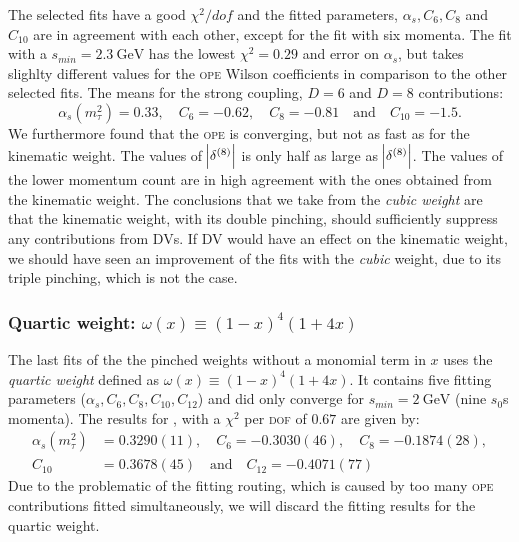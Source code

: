 \documentclass[../../index.tex]{subfiles}
\begin{document}
The selected fits have a good \(\chi^2/dof\) and the fitted parameters,
\(\alpha_s, C_6, C_8\) and \(C_{10}\) are in agreement with each other, except
for the fit with six momenta. The fit with a \(s_{min}=\SI{2.3}{\giga\eV}\) has
the lowest \(\chi^2=0.29\) and error on \(\alpha_s\), but takes slighlty
different values for the \textsc{ope} Wilson coefficients in comparison to the
other selected fits. The means for the strong coupling, \(D=6\) and \(D=8\)
contributions:
\begin{equation}
  \label{eq:wKinResult}
  \alpha_s(m_\tau^2)=0.33, \quad C_6=-0.62, \quad C_8=-0.81 \quad \text{and} \quad C_{10}=-1.5.
\end{equation}
We furthermore found that the \textsc{ope} is converging, but not as fast as for
the kinematic weight. The values of \(\abs{\delta^{(8)}}\) is only half as large
as \(\abs{\delta^{(8)}}\). The values of the lower momentum count are in high
agreement with the ones obtained from the kinematic weight. The conclusions that
we take from the \textit{cubic weight} are that the kinematic weight, with its
double pinching, should sufficiently suppress any contributions from
\textsc{DV}s. If \textsc{DV} would have an effect on the kinematic weight, we
should have seen an improvement of the fits with the \textit{cubic} weight, due
to its triple pinching, which is not the case.

\subsubsection{Quartic weight: \(\omega(x) \equiv (1-x)^4(1+4x)\)}
\label{sec:quarticWeight}
The last fits of the the pinched weights without a monomial term in \(x\) uses
the \textit{quartic weight} defined as \(\omega(x) \equiv (1-x)^4(1+4x)\). It
contains five fitting parameters (\(\alpha_s, C_6, C_8, C_{10}, C_{12}\)) and
did only converge for \(s_{min}=\SI{2}{\giga\eV}\) (nine \(s_0\)s momenta). The
results for , with a \(\chi^2\) per \textsc{dof} of \(0.67\) are given by:
\begin{equation}
  \begin{split}
    \alpha_s(m_\tau^2) &= 0.3290(11), \quad C_6=-0.3030(46), \quad C_8=-0.1874(28), \\
    C_{10} &= 0.3678(45) \quad \text{and} \quad C_{12}=-0.4071(77)
  \end{split}
\end{equation}
Due to the problematic of the fitting routing, which is caused by too many
\textsc{ope} contributions fitted simultaneously, we will discard the fitting
results for the quartic weight.
\end{document}
